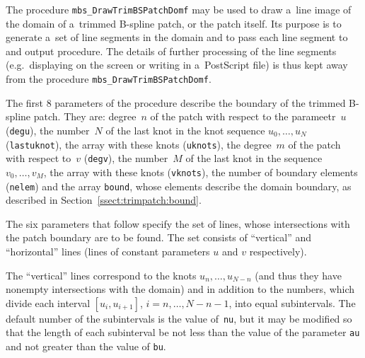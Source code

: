 \vspace{\bigskipamount}
The procedure \texttt{mbs\_DrawTrimBSPatchDomf} may be used to draw a~line
image of the domain of a~trimmed B-spline patch, or the patch itself.
Its purpose is to generate a~set of line segments in the domain
and to pass each line segment to and output procedure.
The details of further processing of the line segments
(e.g.\ displaying on the screen or writing in a~PostScript file)
is thus kept away from the procedure
\texttt{mbs\_DrawTrimBSPatchDomf}.

The first $8$ parameters of the procedure describe the boundary of the
trimmed B-spline patch. They are: degree~$n$ of the patch with respect to
the parameetr~$u$ (\texttt{degu}), the number~$N$ of the last knot
in the knot sequence $u_0,\ldots,u_N$ (\texttt{lastuknot}), the array with
these knots (\texttt{uknots}), the degree~$m$ of the patch with respect to~$v$
(\texttt{degv}), the number~$M$ of the last knot in the sequence
$v_0,\ldots,v_M$, the array with these knots (\texttt{vknots}), the number of
boundary elements (\texttt{nelem}) and the array \texttt{bound}, whose
elements describe the domain boundary, as described in
Section~\ref{ssect:trimpatch:bound}.

The six parameters that follow specify the set of lines, whose intersections
with the patch boundary are to be found. The set consists of
``vertical'' and ``horizontal'' lines (lines of constant parameters
$u$ and $v$ respectively).

The ``vertical'' lines correspond to the knots $u_n,\ldots,u_{N-n}$
(and thus they have nonempty intersections with the domain)
and in addition to the numbers, which divide each interval $[u_i,u_{i+1}]$,
$i=n,\ldots,N-n-1$, into equal subintervals.
The default number of the subintervals is the value of~\texttt{nu},
but it may be modified so that the length of each subinterval be
not less than the value of the parameter \texttt{au} and not greater than
the value of \texttt{bu}.

